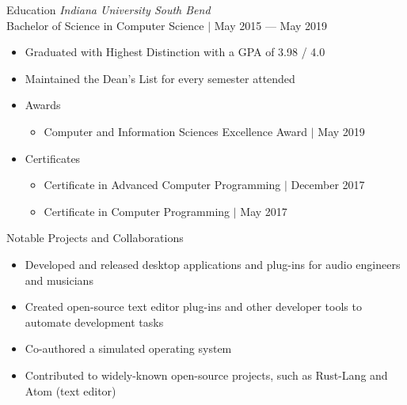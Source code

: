 \documentclass{Joseph_T_Lyons_Resume}
\newenvironment{tightlySpacedList}
{ \begin{itemize}
    \setlength{\itemsep}{0pt}
    \setlength{\parskip}{0pt}
    \setlength{\parsep}{0pt}     }
{ \end{itemize}                  }
\begin{document}
\begin{rSection}{Education}
\textit{Indiana University South Bend}
\\Bachelor of Science in Computer Science $\mid$ May 2015 --- May 2019
\begin{tightlySpacedList}
    \item Graduated with Highest Distinction with a GPA of 3.98 / 4.0
    \item Maintained the Dean's List for every semester attended
    \item Awards
    \begin{tightlySpacedList}
        \item Computer and Information Sciences Excellence Award $\mid$ May 2019
    \end{tightlySpacedList}
    \item Certificates
    \begin{tightlySpacedList}
        \item Certificate in Advanced Computer Programming $\mid$ December 2017
        \item Certificate in Computer Programming $\mid$ May 2017
    \end{tightlySpacedList}
\end{tightlySpacedList}
\end{rSection}

\newpage

\begin{rSection}{Notable Projects and Collaborations}
\begin{tightlySpacedList}
    \item Developed and released desktop applications and plug-ins for audio
     engineers and musicians
    \item Created open-source text editor plug-ins and other developer tools to
     automate development tasks
    \item Co-authored a simulated operating system
    \item Contributed to widely-known open-source projects, such as Rust-Lang
     and Atom (text editor)
\end{tightlySpacedList}
\end{rSection}
\end{document}
